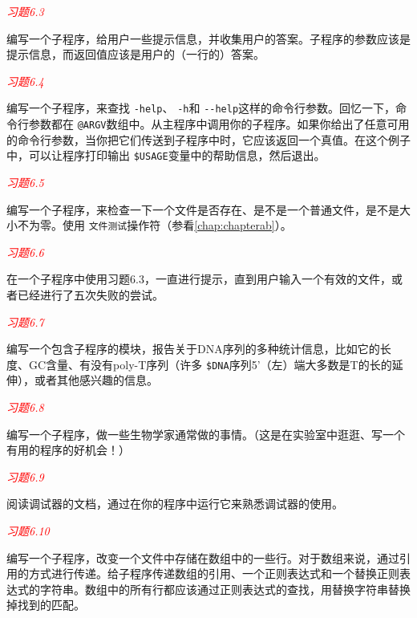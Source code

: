 \textcolor{red}{\textit{习题6.3}}
\begin{adjustwidth}{4em}{}
编写一个子程序，给用户一些提示信息，并收集用户的答案。子程序的参数应该是提示信息，而返回值应该是用户的（一行的）答案。
\end{adjustwidth}

\textcolor{red}{\textit{习题6.4}}
\begin{adjustwidth}{4em}{}
编写一个子程序，来查找 \verb|-help|、 \verb|-h|和 \verb|--help|这样的命令行参数。回忆一下，命令行参数都在 \verb|@ARGV|数组中。从主程序中调用你的子程序。如果你给出了任意可用的命令行参数，当你把它们传送到子程序中时，它应该返回一个真值。在这个例子中，可以让程序打印输出 \verb|$USAGE|变量中的帮助信息，然后退出。
\end{adjustwidth}

\textcolor{red}{\textit{习题6.5}}
\begin{adjustwidth}{4em}{}
编写一个子程序，来检查一下一个文件是否存在、是不是一个普通文件，是不是大小不为零。使用 \verb|文件测试|操作符（参看\autoref{chap:chapterab}）。
\end{adjustwidth}

\textcolor{red}{\textit{习题6.6}}
\begin{adjustwidth}{4em}{}
在一个子程序中使用习题6.3，一直进行提示，直到用户输入一个有效的文件，或者已经进行了五次失败的尝试。
\end{adjustwidth}

\textcolor{red}{\textit{习题6.7}}
\begin{adjustwidth}{4em}{}
编写一个包含子程序的模块，报告关于DNA序列的多种统计信息，比如它的长度、GC含量、有没有poly-T序列（许多 \verb|$DNA|序列5'（左）端大多数是T的长的延伸），或者其他感兴趣的信息。
\end{adjustwidth}

\textcolor{red}{\textit{习题6.8}}
\begin{adjustwidth}{4em}{}
编写一个子程序，做一些生物学家通常做的事情。（这是在实验室中逛逛、写一个有用的程序的好机会！）
\end{adjustwidth}

\textcolor{red}{\textit{习题6.9}}
\begin{adjustwidth}{4em}{}
阅读调试器的文档，通过在你的程序中运行它来熟悉调试器的使用。
\end{adjustwidth}

\textcolor{red}{\textit{习题6.10}}
\begin{adjustwidth}{4em}{}
编写一个子程序，改变一个文件中存储在数组中的一些行。对于数组来说，通过引用的方式进行传递。给子程序传递数组的引用、一个正则表达式和一个替换正则表达式的字符串。数组中的所有行都应该通过正则表达式的查找，用替换字符串替换掉找到的匹配。
\end{adjustwidth}
